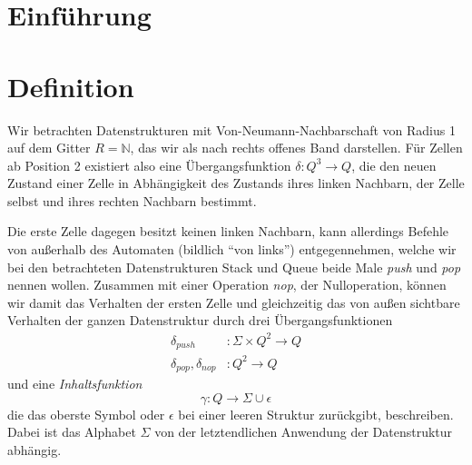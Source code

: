 \documentclass{article}
\begin{document}
\newcommand{\ca}{\ensuremath\mathcal{A}}
\newcommand{\abs}[1]{\lvert#1\rvert}
\newcommand{\ceil}[1]{\lceil#1\rceil}
\newcommand{\zrange}[1]{\mathbb{G}_{#1}}
\newcommand{\bild}[1]{\text{Bild}(#1)}
\newcommand{\N}{\mathbb{N}}
\newcommand{\ve}[3]{\begin{pmatrix}#1\\#2\\#3\end{pmatrix}}

\section{Einführung}

\section{Definition}
Wir betrachten Datenstrukturen mit Von-Neumann-Nachbarschaft von Radius 1 auf dem Gitter $R = \N$, das wir als nach rechts offenes Band darstellen. Für Zellen ab Position 2 existiert also eine Übergangsfunktion $\delta : Q^3 \rightarrow Q$, die den neuen Zustand einer Zelle in Abhängigkeit des Zustands ihres linken Nachbarn, der Zelle selbst und ihres rechten Nachbarn bestimmt.

Die erste Zelle dagegen besitzt keinen linken Nachbarn, kann allerdings Befehle von außerhalb des Automaten (bildlich "`von links"') entgegennehmen, welche wir bei den betrachteten Datenstrukturen Stack und Queue beide Male \emph{push} und \emph{pop} nennen wollen. Zusammen mit einer Operation \emph{nop}, der Nulloperation, können wir damit das Verhalten der ersten Zelle und gleichzeitig das von außen sichtbare Verhalten der ganzen Datenstruktur durch drei Übergangsfunktionen
\begin{align*}
    \delta_{push} &: \Sigma \times Q^2 \rightarrow Q \\
    \delta_{pop}, \delta_{nop} &: Q^2 \rightarrow Q
\end{align*}
und eine \emph{Inhaltsfunktion}
\[ \gamma : Q \rightarrow \Sigma \cup {\epsilon} \]
die das oberste Symbol oder $\epsilon$ bei einer leeren Struktur zurückgibt, beschreiben. Dabei ist das Alphabet $\Sigma$ von der letztendlichen Anwendung der Datenstruktur abhängig.
\end{document}
